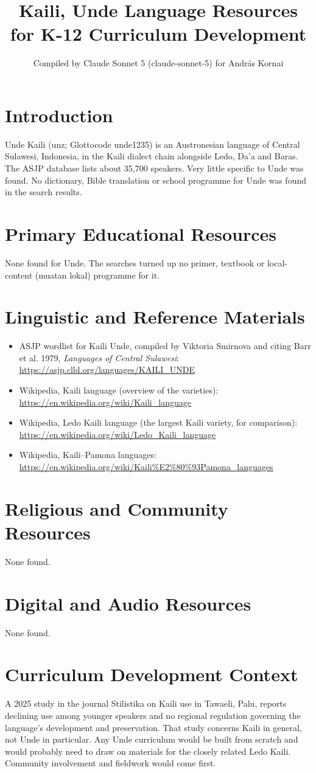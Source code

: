 \documentclass[12pt]{article}
\title{Kaili, Unde Language Resources for K-12 Curriculum Development}
\author{Compiled by Claude Sonnet 5 (claude-sonnet-5) for Andr\'as Kornai}
\date{}
\begin{document}
\maketitle

\section{Introduction}
Unde Kaili (unz; Glottocode unde1235) is an Austronesian language of Central Sulawesi, Indonesia, in the Kaili dialect chain alongside Ledo, Da'a and Baras. The ASJP database lists about 35,700 speakers. Very little specific to Unde was found. No dictionary, Bible translation or school programme for Unde was found in the search results.

\section{Primary Educational Resources}
None found for Unde. The searches turned up no primer, textbook or local-content (muatan lokal) programme for it.

\section{Linguistic and Reference Materials}
\begin{itemize}
\item ASJP wordlist for Kaili Unde, compiled by Viktoria Smirnova and citing Barr et al. 1979, \emph{Languages of Central Sulawesi}: \url{https://asjp.clld.org/languages/KAILI_UNDE}
\item Wikipedia, Kaili language (overview of the varieties): \url{https://en.wikipedia.org/wiki/Kaili_language}
\item Wikipedia, Ledo Kaili language (the largest Kaili variety, for comparison): \url{https://en.wikipedia.org/wiki/Ledo_Kaili_language}
\item Wikipedia, Kaili--Pamona languages: \url{https://en.wikipedia.org/wiki/Kaili%E2%80%93Pamona_languages}
\end{itemize}

\section{Religious and Community Resources}
None found.

\section{Digital and Audio Resources}
None found.

\section{Curriculum Development Context}
A 2025 study in the journal Stilistika on Kaili use in Tawaeli, Palu, reports declining use among younger speakers and no regional regulation governing the language's development and preservation. That study concerns Kaili in general, not Unde in particular. Any Unde curriculum would be built from scratch and would probably need to draw on materials for the closely related Ledo Kaili. Community involvement and fieldwork would come first.
\end{document}
